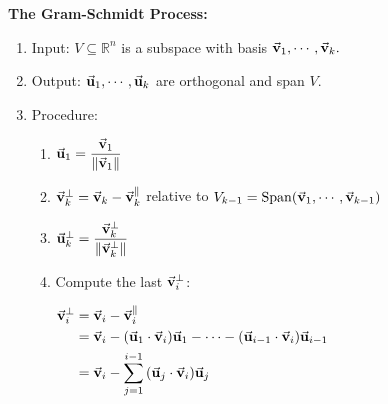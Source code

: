 \documentclass[12pt, a4paper]{article}
\def\R{{\mathbb{R}}}
\def\Span{\mathrm{Span}}
\def\vecv{\va{v}}
\def\vecu{\va{u}}
\begin{document}
\begin{framed}
\textbf{The Gram-Schmidt Process:}
\begin{enumerate}
	\item Input: $V\subseteq\R^n$ is a subspace with basis $\vecv_1,\cdots,\vecv_k.$
	\item Output: $\vecu_1,\cdots,\vecu_k$ are orthogonal and span $V.$
	\item Procedure: 
	\begin{enumerate}
		\item $\vecu_1=\dfrac{\vecv_1}{\|\vecv_1\|}$
		\item $\vecv_k^\perp=\vecv_k-\vecv_k^\parallel$ relative to $V_{k-1}=\Span\qty(\vecv_1,\cdots,\vecv_{k-1})$
		\item $\vecu_k^\perp=\dfrac{\vecv_k^\perp}{\|\vecv_k^\perp\|}$
		\item Compute the last $\vecv_i^\perp$: \par $\begin{aligned}\vecv_i^\perp&=\vecv_i-\vecv_i^\parallel\\&=\vecv_i-\qty(\vecu_1\cdot\vecv_i)\vecu_1-\cdots-\qty(\vecu_{i-1}\cdot\vecv_i)\vecu_{i-1}\\&=\vecv_i-\sum_{j=1}^{i-1}\qty(\vecu_j\cdot\vecv_i)\vecu_j\end{aligned}$
	\end{enumerate}
\end{enumerate}
\end{framed}
\end{document}
